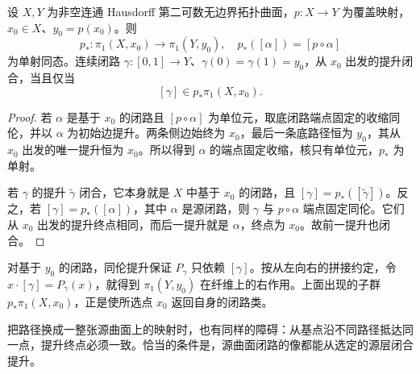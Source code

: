 \begin{proposition}[闭合提升与基本群]\label{b3:prop:11-closed-lift}
设 \(X,Y\) 为非空连通 Hausdorff 第二可数无边界拓扑曲面，\(p:X\to Y\) 为覆盖映射，\(x_0\in X\)、\(y_0=p(x_0)\)。则
\[
 p_*:\pi_1(X,x_0)\longrightarrow\pi_1(Y,y_0),
 \quad p_*([\alpha])=[p\circ\alpha]
\]
为单射同态。连续闭路 \(\gamma:[0,1]\to Y\)、\(\gamma(0)=\gamma(1)=y_0\)，从 \(x_0\) 出发的提升闭合，当且仅当
\[
 [\gamma]\in p_*\pi_1(X,x_0).
\]
\end{proposition}
\begin{proof}
若 \(\alpha\) 是基于 \(x_0\) 的闭路且 \([p\circ\alpha]\) 为单位元，取底闭路端点固定的收缩同伦，并以 \(\alpha\) 为初始边提升。两条侧边始终为 \(x_0\)，最后一条底路径恒为 \(y_0\)，其从 \(x_0\) 出发的唯一提升恒为 \(x_0\)。所以得到 \(\alpha\) 的端点固定收缩，核只有单位元，\(p_*\) 为单射。

若 \(\gamma\) 的提升 \(\widetilde\gamma\) 闭合，它本身就是 \(X\) 中基于 \(x_0\) 的闭路，且 \([\gamma]=p_*([\widetilde\gamma])\)。反之，若 \([\gamma]=p_*([\alpha])\)，其中 \(\alpha\) 是源闭路，则 \(\gamma\) 与 \(p\circ\alpha\) 端点固定同伦。它们从 \(x_0\) 出发的提升终点相同，而后一提升就是 \(\alpha\)，终点为 \(x_0\)。故前一提升也闭合。
\end{proof}
对基于 \(y_0\) 的闭路，同伦提升保证 \(P_\gamma\) 只依赖 \([\gamma]\)。按从左向右的拼接约定，令 \(x\cdot[\gamma]=P_\gamma(x)\)，就得到 \(\pi_1(Y,y_0)\) 在纤维上的右作用。上面出现的子群 \(p_*\pi_1(X,x_0)\)，正是使所选点 \(x_0\) 返回自身的闭路类。

\ProseParagraphBreak
把路径换成一整张源曲面上的映射时，也有同样的障碍：从基点沿不同路径抵达同一点，提升终点必须一致。恰当的条件是，源曲面闭路的像都能从选定的源层闭合提升。


